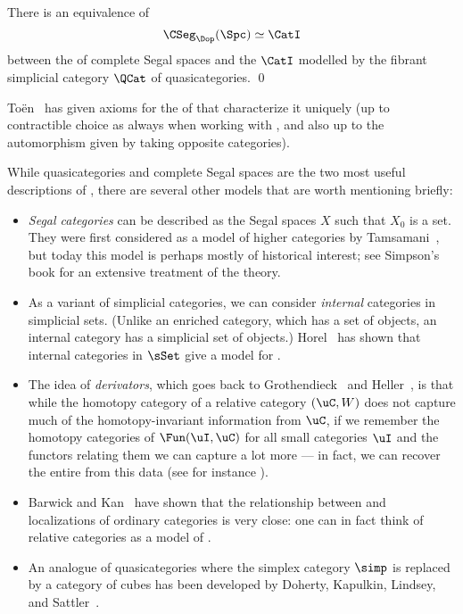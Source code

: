 \documentclass[a4paper,12pt]{article}
\begin{document}
\begin{thm}
  There is an equivalence of \icats{}
  \[ \CSeg_{\Dop}(\Spc) \simeq \CatI \]
  between the \icat{} of complete Segal spaces and the \icat{} $\CatI$
  modelled by the fibrant simplicial category $\QCat$ of quasicategories. \qed
\end{thm}

\begin{remark}
  To\"en~\cite{ToenVers} has given axioms for the \icat{} of \icats{}
  that characterize it uniquely (up to contractible choice as always
  when working with \icats{}, and also up to the automorphism given by
  taking opposite categories).
\end{remark}

\begin{remark}
  While quasicategories and complete Segal spaces are the two most
  useful descriptions of \icats{}, there are several other models that
  are worth mentioning briefly:
  \begin{itemize}
  \item \emph{Segal categories} can be described as the Segal spaces
    $X$ such that $X_{0}$ is a set. They were first considered as a
    model of higher categories by Tamsamani~\cite{Tamsamani}, but today this
    model is perhaps mostly of historical interest; see Simpson's book
    \cite{Simpson} for an extensive treatment of the theory.
  \item As a variant of simplicial
    categories, we can consider \emph{internal} categories in
    simplicial sets. (Unlike an enriched category, which has a set of
    objects, an internal
    category has a simplicial set of
    objects.) Horel~\cite{HorelInternal} has shown that internal
    categories in $\sSet$ give a model for \icats{}.
  \item The idea of \emph{derivators}, which goes back to
    Grothendieck~\cite{GrothendieckStacks,GrothendieckDer} and
    Heller~\cite{Heller}, is that while the homotopy category of a
    relative category $(\uC, W)$ does not capture much of the
    homotopy-invariant information from $\uC$, if we remember the
    homotopy categories of $\Fun(\uI,\uC)$ for all small categories
    $\uI$ and the functors relating them we can capture a lot more ---
    in fact, we can recover the entire \icat{} from this data (see for
    instance \cite{Renaudin,Prederiv}).
  \item Barwick and Kan~\cite{BarwickKan} have shown that the
    relationship between \icats{} and localizations of ordinary
    categories is very close: one can in fact think of relative
    categories as a model of \icats{}.
  \item An analogue of quasicategories where the simplex category
    $\simp$ is replaced by a category of cubes has been developed by
    Doherty, Kapulkin, Lindsey, and Sattler~\cite{DKLSCube}.
  \end{itemize}
\end{remark}
\end{document}
